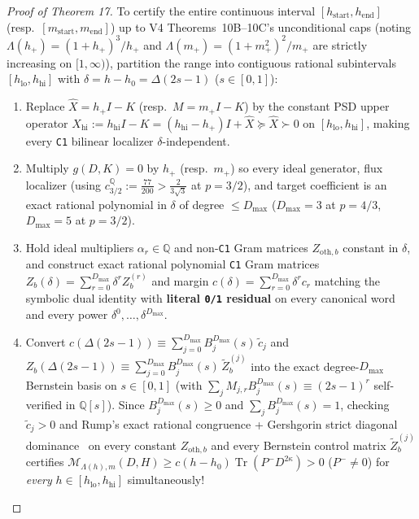\documentclass[10pt,letterpaper]{article}
\newcommand{\Q}{\mathbb{Q}}
\newcommand{\Tr}{\operatorname{Tr}}
\begin{document}
\begin{proof}[Proof of Theorem 17]
To certify the entire continuous interval $[h_{\mathrm{start}}, h_{\mathrm{end}}]$ (resp.\ $[m_{\mathrm{start}}, m_{\mathrm{end}}]$) up to V4 Theorems~10B--10C's unconditional caps (noting $\Lambda(h_+) = (1+h_+)^3/h_+$ and $\Lambda(m_+) = (1+m_+^2)^2/m_+$ are strictly increasing on $[1, \infty)$), partition the range into contiguous rational subintervals $[h_{\mathrm{lo}}, h_{\mathrm{hi}}]$ with $\delta = h - h_0 = \Delta(2s - 1)$ ($s \in [0, 1]$):
\begin{enumerate}[leftmargin=1.6em,itemsep=1.5pt]
  \item Replace $\widehat{X} = h_+ I - K$ (resp.\ $M = m_+ I - K$) by the constant PSD upper operator $X_{\mathrm{hi}} := h_{\mathrm{hi}} I - K = (h_{\mathrm{hi}} - h_+)I + \widehat{X} \succeq \widehat{X} \succ 0$ on $[h_{\mathrm{lo}}, h_{\mathrm{hi}}]$, making every \texttt{C1} bilinear localizer $\delta$-independent.
  \item Multiply $g(D, K) = 0$ by $h_+$ (resp.\ $m_+$) so every ideal generator, flux localizer (using $c_{3/2}^{\Q} := \frac{77}{200} > \frac{2}{3\sqrt{3}}$ at $p = 3/2$), and target coefficient is an exact rational polynomial in $\delta$ of degree $\le D_{\max}$ ($D_{\max} = 3$ at $p = 4/3$, $D_{\max} = 5$ at $p = 3/2$).
  \item Hold ideal multipliers $\alpha_r \in \Q$ and non-\texttt{C1} Gram matrices $Z_{\mathrm{oth}, b}$ constant in $\delta$, and construct exact rational polynomial \texttt{C1} Gram matrices $Z_b(\delta) = \sum_{r=0}^{D_{\max}} \delta^r Z_b^{(r)}$ and margin $c(\delta) = \sum_{r=0}^{D_{\max}} \delta^r c_r$ matching the symbolic dual identity with \textbf{literal \texttt{0/1} residual} on every canonical word and every power $\delta^0,\dots,\delta^{D_{\max}}$.
  \item Convert $c(\Delta(2s-1)) \equiv \sum_{j=0}^{D_{\max}} B_j^{D_{\max}}(s)\,\widetilde{c}_j$ and $Z_b(\Delta(2s-1)) \equiv \sum_{j=0}^{D_{\max}} B_j^{D_{\max}}(s)\,\widetilde{Z}_b^{(j)}$ into the exact degree-$D_{\max}$ Bernstein basis on $s \in [0, 1]$ (with $\sum_j M_{j,r} B_j^{D_{\max}}(s) \equiv (2s-1)^r$ self-verified in $\Q[s]$). Since $B_j^{D_{\max}}(s) \ge 0$ and $\sum_j B_j^{D_{\max}}(s) = 1$, checking $\widetilde{c}_j > 0$ and Rump's exact rational congruence + Gershgorin strict diagonal dominance~\cite{Rump2010} on every constant $Z_{\mathrm{oth}, b}$ and every Bernstein control matrix $\widetilde{Z}_b^{(j)}$ certifies $\mathcal{M}_{\Lambda(h), m}(D, H) \ge c(h-h_0)\Tr(P^- D^{2\kappa}) > 0$ ($P^- \neq 0$) for \emph{every} $h \in [h_{\mathrm{lo}}, h_{\mathrm{hi}}]$ simultaneously!

\end{enumerate}
\end{proof}
\end{document}

